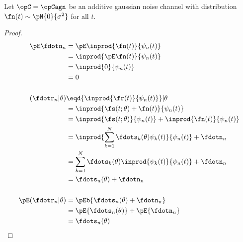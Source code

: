 {%
\begin{theorem}%
\label{thm:agn_stats}
Let $\opC=\opCagn$ be an additive gaussian noise channel
with distribution $\fn(t)\sim\pN{0}{\sigma^2}$ for all $t$.
\end{theorem}
\begin{proof}
\begin{align*}
   \pE\fdotn_{n}
     &= \pE\inprod{\fn(t)}{\psi_n(t)}
   \\&= \inprod{\pE\fn(t)}{\psi_n(t)}
   \\&= \inprod{0}{\psi_n(t)}
   \\&= 0
\\
\\
   (\fdotr_n |\theta)
     &\eqd {\inprod{\fr(t)}{\psi_n(t)}}  |\theta
   \\&=    {\inprod{\fs(t;\theta)+\fn(t)}{\psi_n(t)}}
   \\&=    {\inprod{\fs(t;\theta)}{\psi_n(t)}} +   {\inprod{\fn(t)}{\psi_n(t)}}
   \\&=    \inprod{\sum_{k=1}^N \fdots_k(\theta) \psi_k(t)}{\psi_n(t)} + \fdotn_n
   \\&=    \sum_{k=1}^N \fdots_k(\theta) \inprod{\psi_k(t)}{\psi_n(t)} + \fdotn_n
   \\&=    \fdots_n(\theta)  + \fdotn_n
\\ \\
   \pE({\fdotr_n} | \theta)
     &= \pEb{\fdots_n(\theta)  + \fdotn_n}
   \\&= \pE{\fdots_n(\theta) } +   \pE{\fdotn_n}
   \\&= \fdots_n(\theta)
\end{align*}


\end{proof}}
